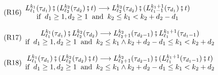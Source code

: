 \documentclass[12pt, a4paper]{article}
\newcommand{\layer}[3]{L^{\smash{#1}}_{\smash{#2}}(#3)}
\begin{document}
\begin{figure}[h]
{\begin{minipage}{0.982\linewidth}
\begin{center}
        \vspace{-0.5em}
        \hspace{-0.8em}
        \begin{subfigure}{0.76\textwidth}
            \begin{equation}\label{ru:swap:layernatctx}\tag{R16}
                \begin{array}{c}
                    \layer{k_1}{\ell_1}{\tau_{d_1}}\fatsemi (\layer{k_2}{\ell_2}{\tau_{d_2}}\fatsemi t) \longrightarrow \layer{k_2}{\ell_2}{\tau_{d_2}}\fatsemi (\layer{k_1+1}{\ell_1-1}{\tau_{d_1}}\fatsemi t) \\
                    \text{if}\;\; d_1\ge1,d_2\ge1 \;\;\text{and}\;\; k_2\le k_1<k_2+d_2-d_1
                \end{array}
            \end{equation}
        \end{subfigure}

        \vspace{-0.5em}
        \hspace{-0.8em}
        \begin{subfigure}{0.84\textwidth}
            \begin{equation}\label{ru:swap:layercon}\tag{R17}
                \begin{array}{c}
                    \layer{k_1}{\ell_1}{\tau_{d_1}}\fatsemi\layer{k_2}{\ell_2}{\tau_{d_2}} \longrightarrow \layer{k_2}{\ell_2+1}{\tau_{d_2-1}}\fatsemi \layer{k_1+1}{\ell_1}{\tau_{d_1-1}} \\
                    \text{if}\;\; d_1\ge1,d_2\ge1 \;\;\text{and}\;\; k_2\le k_1\wedge k_2+d_2-d_1\le k_1<k_2+d_2
                \end{array}
            \end{equation}
        \end{subfigure}

        \vspace{-0.5em}
        \hspace{-0.8em}
        \begin{subfigure}{0.84\textwidth}
            \begin{equation}\label{ru:swap:layerconctx}\tag{R18}
                \begin{array}{c}
                    \layer{k_1}{\ell_1}{\tau_{d_1}}\fatsemi (\layer{k_2}{\ell_2}{\tau_{d_2}}\fatsemi t) \longrightarrow \layer{k_2}{\ell_2+1}{\tau_{d_2-1}}\fatsemi (\layer{k_1+1}{\ell_1}{\tau_{d_1-1}}\fatsemi t) \\
                    \text{if}\;\; d_1\ge1,d_2\ge1 \;\;\text{and}\;\; k_2\le k_1\wedge k_2+d_2-d_1\le k_1<k_2+d_2
                \end{array}
            \end{equation}
        \end{subfigure}


\end{center}
\end{minipage}}
\end{figure}
\end{document}

